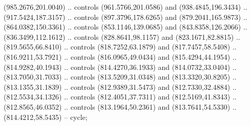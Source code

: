 \begin{scope}[shift={(-127.26916,-608.18524)}]
\begin{scope}
\begin{scope}[shift={(-630.60299,773.9938)},opacity=0.500,transparency group]
        (985.2676,201.0040) .. controls (961.5766,201.0586) and (938.4845,196.3434) ..
        (917.5424,187.3157) .. controls (897.3796,178.6265) and (879.2041,165.9873) ..
        (864.0382,150.3361) .. controls (853.1146,139.0685) and (843.8358,126.2066) ..
        (836.3499,112.1612) .. controls (828.8641,98.1157) and (823.1671,82.8815) ..
        (819.5655,66.8410) .. controls (818.7252,63.1879) and (817.7457,58.5408) ..
        (816.9211,53.7921) .. controls (816.0965,49.0434) and (815.4294,44.1954) ..
        (814.9282,40.1943) .. controls (814.4270,36.1933) and (814.0732,33.0404) ..
        (813.7050,31.7033) .. controls (813.5209,31.0348) and (813.3320,30.8205) ..
        (813.1355,31.1839) .. controls (812.9389,31.5473) and (812.7330,32.4884) ..
        (812.5534,34.1326) .. controls (812.4051,37.7311) and (812.5169,41.8343) ..
        (812.8565,46.0352) .. controls (813.1964,50.2361) and (813.7641,54.5330) ..
        (814.4212,58.5435) -- cycle;


\end{scope}
\end{scope}
\end{scope}
